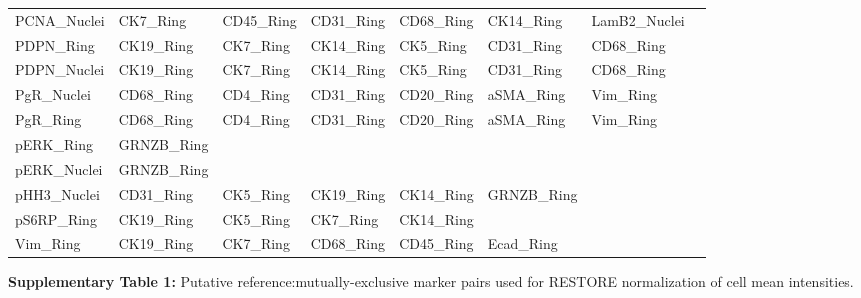 \documentclass[preprint,review,3p,12pt]{elsarticle}
\begin{document}
\begin{supptable}[p]
{\begin{tabular}{l | l l l l l l l}
PCNA\_Nuclei  & CK7\_Ring     & CD45\_Ring    & CD31\_Ring  & CD68\_Ring    & CK14\_Ring    & LamB2\_Nuclei &               \\
PDPN\_Ring    & CK19\_Ring    & CK7\_Ring     & CK14\_Ring  & CK5\_Ring     & CD31\_Ring    & CD68\_Ring    &               \\
PDPN\_Nuclei  & CK19\_Ring    & CK7\_Ring     & CK14\_Ring  & CK5\_Ring     & CD31\_Ring    & CD68\_Ring    &               \\
PgR\_Nuclei   & CD68\_Ring    & CD4\_Ring     & CD31\_Ring  & CD20\_Ring    & aSMA\_Ring    & Vim\_Ring     &               \\
PgR\_Ring     & CD68\_Ring    & CD4\_Ring     & CD31\_Ring  & CD20\_Ring    & aSMA\_Ring    & Vim\_Ring     &               \\
pERK\_Ring    & GRNZB\_Ring   &               &             &               &               &               &               \\
pERK\_Nuclei  & GRNZB\_Ring   &               &             &               &               &               &               \\
pHH3\_Nuclei  & CD31\_Ring    & CK5\_Ring     & CK19\_Ring  & CK14\_Ring    & GRNZB\_Ring   &               &               \\
pS6RP\_Ring   & CK19\_Ring    & CK5\_Ring     & CK7\_Ring   & CK14\_Ring    &               &               &               \\
Vim\_Ring     & CK19\_Ring    & CK7\_Ring     & CD68\_Ring  & CD45\_Ring    & Ecad\_Ring    &               &              
\end{tabular}}
\caption{}
\label{tab:mepairs}
\end{supptable}

\newpage

\noindent
\textbf{Supplementary Table 1:} Putative reference:mutually-exclusive marker pairs used for RESTORE normalization of cell mean intensities.






\end{document}
